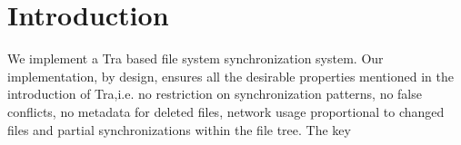 \section {Introduction}
We implement a Tra based file system synchronization system. Our implementation, by design, ensures all the desirable properties mentioned in the introduction of Tra,i.e. no restriction on synchronization patterns, no false conflicts, no metadata for deleted files, network usage proportional to changed files and partial synchronizations within the file tree. The key 
